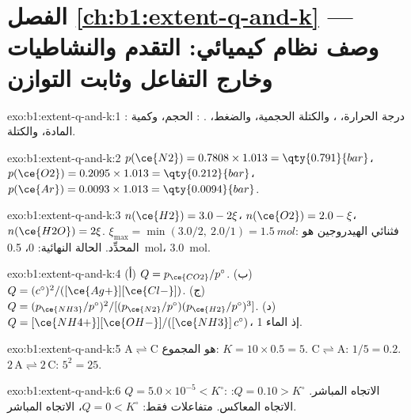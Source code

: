 \section*{الفصل \ref{ch:b1:extent-q-and-k} --- وصف نظام كيميائي: التقدم والنشاطيات وخارج التفاعل وثابت التوازن}

\begin{solution}{exo:b1:extent-q-and-k:1}
: درجة الحرارة، ، والكتلة الحجمية، والضغط، . : الحجم، وكمية المادة، والكتلة.
\end{solution}

\begin{solution}{exo:b1:extent-q-and-k:2}
$p(\ce{N2}) = 0.7808 \times 1.013 = \qty{0.791}{bar}$، $p(\ce{O2}) =
0.2095 \times 1.013 = \qty{0.212}{bar}$، $p(\ce{Ar}) = 0.0093 \times 1.013
= \qty{0.0094}{bar}$.
\end{solution}

\begin{solution}{exo:b1:extent-q-and-k:3}
$n(\ce{H2}) = 3.0 - 2\xi$، $n(\ce{O2}) = 2.0 - \xi$، $n(\ce{H2O}) =
2\xi$. $\xi_{\max} = \min(3.0/2,\ 2.0/1) = \qty{1.5}{mol}$: فثنائي الهيدروجين هو
المحدِّد. الحالة النهائية:  0،  \qty{0.5}{mol}، 
\qty{3.0}{mol}.
\end{solution}

\begin{solution}{exo:b1:extent-q-and-k:4}
(أ) $Q = p_{\ce{CO2}}/p^\circ$. (ب) $Q = (c^\circ)^2/([\ce{Ag+}][\ce{Cl-}])$.
(ج) $Q = (p_{\ce{NH3}}/p^\circ)^2/[(p_{\ce{N2}}/p^\circ)(p_{\ce{H2}}/p^\circ)^3]$.
(د) $Q = [\ce{NH4+}][\ce{OH-}]/([\ce{NH3}]\,c^\circ)$، إذ  الماء 1.
\end{solution}

\begin{solution}{exo:b1:extent-q-and-k:5}
$\mathrm{A \rightleftharpoons C}$ هو المجموع: $K = 10 \times 0.5 = 5$. $\mathrm{C \rightleftharpoons A}$: $1/5 =
0.2$. $\mathrm{2\,A \rightleftharpoons 2\,C}$: $5^2 = 25$.
\end{solution}

\begin{solution}{exo:b1:extent-q-and-k:6}
$Q = 5.0 \times 10^{-5} < K^\circ$: الاتجاه المباشر. $Q = 0.10 > K^\circ$: الاتجاه المعاكس.
متفاعلات فقط: $Q = 0 < K^\circ$، الاتجاه المباشر.
\end{solution}

